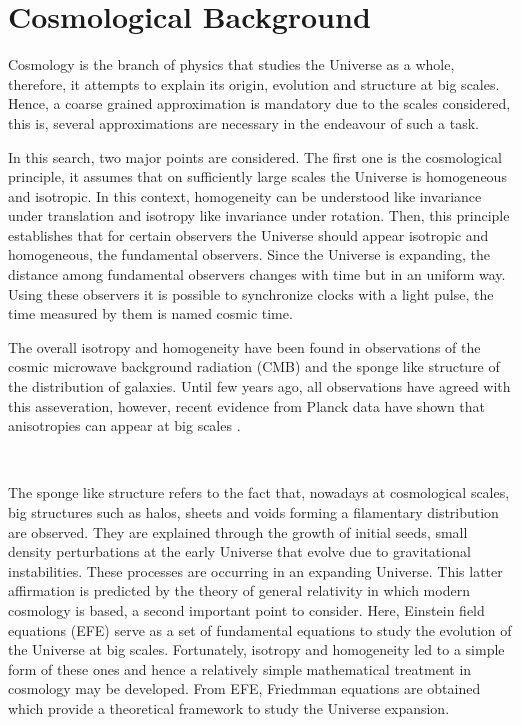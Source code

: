 	\chapter{ Cosmological Background }\label{chap:marco}

Cosmology is the branch of physics that studies the Universe as a whole, 
therefore, it attempts to explain its origin, evolution and structure 
at big scales. Hence, a coarse grained approximation is mandatory due
to the scales considered, this is, several approximations are necessary 
in the endeavour of such a task.

In this search, two major points are considered. The first one is the 
cosmological principle, it assumes that on sufficiently large scales the Universe 
is homogeneous and isotropic. In this context, homogeneity can be understood like 
invariance under translation and isotropy like invariance under rotation. Then, 
this principle establishes that for certain observers the Universe should 
appear isotropic and homogeneous, the fundamental observers.
Since the Universe is expanding, the distance among fundamental observers
changes with time but in an uniform way. Using these observers it is possible to 
synchronize clocks with a light pulse, the time measured by them is named
cosmic time. 


The overall isotropy and homogeneity have been found in observations of the
cosmic microwave background radiation (CMB) and the sponge like structure
of the distribution of galaxies. Until few years ago, all observations have agreed with this 
asseveration, however, recent evidence from Planck data have shown that anisotropies
can appear at big scales \cite{planck}. 

\

The sponge like structure refers to the fact that, nowadays at cosmological scales, 
big structures such as halos, sheets and voids forming a filamentary distribution are observed. 
They are explained through the growth of initial seeds, 
small density perturbations at the early Universe that evolve due to gravitational instabilities. 
These processes are occurring in an expanding Universe. This latter affirmation is predicted 
by the theory of general relativity in which modern cosmology is based, a second important
point to consider. 
Here, Einstein field equations (EFE) serve as a set of fundamental equations to 
study the evolution of the Universe at big scales. Fortunately, isotropy and homogeneity led 
to a simple form of these ones and hence a relatively simple mathematical treatment in cosmology may be
developed. From EFE, Friedmman equations are obtained which provide a theoretical 
framework to study the Universe expansion. 

